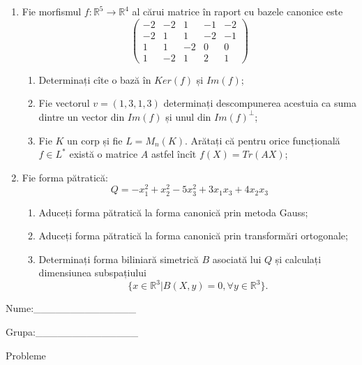 \documentclass{article}
\begin{document}
\begin{enumerate}
 \item Fie morfismul $f:\mathbb{R}^5 \to \mathbb{R}^4$ al cărui matrice în raport cu bazele canonice este
$$\begin{pmatrix}
-2&-2&1&-1&-2\\
-2&1&1&-2&-1\\
1&1&-2&0&0\\
1&-2&1&2&1
\end{pmatrix}$$

\begin{enumerate}
\item Determinați cîte o bază în $Ker(f)$ și $Im(f)$;
\item Fie vectorul $v=(1,3,1,3)$ determinați descompunerea acestuia ca suma dintre un vector din $Im(f)$ și unul din $Im(f)^\perp$;
\item Fie $K$ un corp și fie $L=M_n(K)$. Arătați că pentru orice funcțională $f \in L^*$ există o matrice $A$ astfel încît $f(X)=Tr(AX)$;
\end{enumerate}
\item Fie forma pătratică:
$$Q= -x_1^2+x_2^2-5x_3^2+3x_1x_3+4x_2x_3$$

\begin{enumerate}
\item Aduceți forma pătratică la forma canonică prin metoda Gauss;
\item Aduceți forma pătratică la forma canonică prin transformări ortogonale;
\item Determinați forma biliniară simetrică $B$ asociată lui $Q$ și calculați dimensiunea subspațiului
$$\{x \in \mathbb{R}^3 | B(X,y)=0,\forall y \in \mathbb{R}^3\}.$$

\end{enumerate}
\end{enumerate}
\newpage
\begin{flushright}
Nume:\_\_\_\_\_\_\_\_\_\_\_\_\_\_
 
 
Grupa:\_\_\_\_\_\_\_\_\_\_\_\_\_\_
\end{flushright}
\begin{center}
\vspace{2cm}
{\Large Probleme}
\vspace{2cm}
\end{center}
\end{document}
